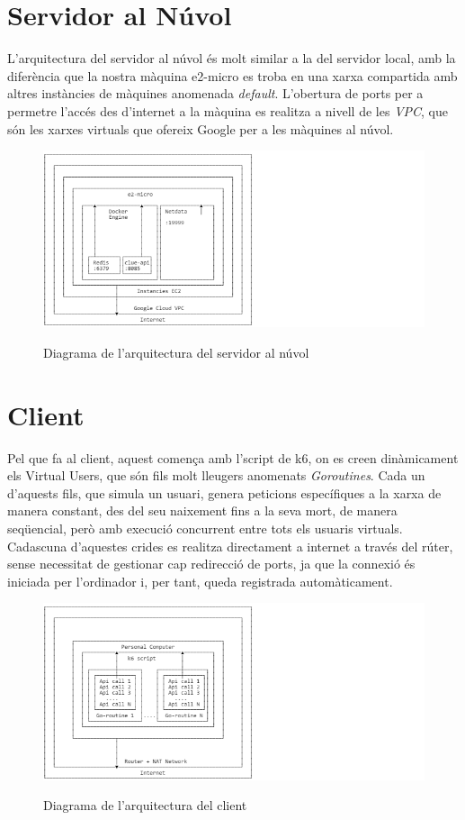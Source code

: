 \newpage
\section{Servidor al Núvol}
L'arquitectura del servidor al núvol és molt similar a la del servidor local, amb la diferència que la nostra màquina e2-micro es troba en una xarxa compartida amb altres instàncies de màquines anomenada \textit{default}. L'obertura de ports per a permetre l'accés des d'internet a la màquina es realitza a nivell de les \textit{VPC}, que són les xarxes virtuals que ofereix Google per a les màquines al núvol.\cite{noauthor_vpc_nodate}

\begin{figure}[!htbp] \includegraphics[width=1.75\textwidth]{Imatges/Server-Cloud.png} \label{fig:ServerNuvul
} \caption{Diagrama de l'arquitectura del servidor al núvol} \end{figure}
    

\newpage

\section{Client}

Pel que fa al client, aquest comença amb l'script de k6, on es creen dinàmicament els Virtual Users, que són fils molt lleugers anomenats \textit{Goroutines}. Cada un d'aquests fils, que simula un usuari, genera peticions específiques a la xarxa de manera constant, des del seu naixement fins a la seva mort, de manera seqüencial, però amb execució concurrent entre tots els usuaris virtuals. Cadascuna d'aquestes crides es realitza directament a internet a través del rúter, sense necessitat de gestionar cap redirecció de ports, ja que la connexió és iniciada per l'ordinador i, per tant, queda registrada automàticament.\cite{stoykov_why_nodate}

\begin{figure}[!htbp] \includegraphics[width=1.75\textwidth]{Imatges/Client-Local.png}  \label{fig:ClientLocal} \caption{Diagrama de l'arquitectura del client} \end{figure}

